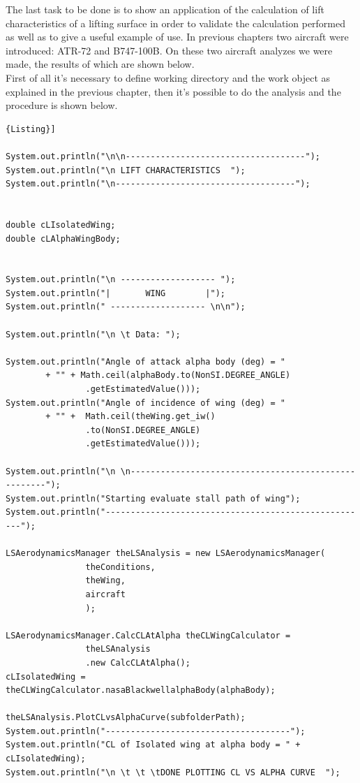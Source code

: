The last task to be done is to show an application of the calculation of lift characteristics of a lifting surface in order
to validate the calculation performed as well as to give a useful example of use. In previous chapters two aircraft were introduced:
ATR-72 and B747-100B. On these two aircraft analyzes we were made, the results of which are shown below.\\
First of all it's necessary to define working directory and the work object as explained in the previous chapter, then it's possible to do the analysis and the procedure is shown below.

\begin{lstlisting}[frame=rbl,caption={{\footnotesize Lift Characteristics of a Lifting Surface - Test Class}},label= [style=\bfseries]{Listing}]

System.out.println("\n\n------------------------------------");
System.out.println("\n LIFT CHARACTERISTICS  ");
System.out.println("\n------------------------------------");


double cLIsolatedWing;
double cLAlphaWingBody;


System.out.println("\n ------------------- ");
System.out.println("|       WING        |");
System.out.println(" ------------------- \n\n");

System.out.println("\n \t Data: ");

System.out.println("Angle of attack alpha body (deg) = "
		+ "" + Math.ceil(alphaBody.to(NonSI.DEGREE_ANGLE)
				.getEstimatedValue()));
System.out.println("Angle of incidence of wing (deg) = "
		+ "" +  Math.ceil(theWing.get_iw()
				.to(NonSI.DEGREE_ANGLE)
				.getEstimatedValue()));

System.out.println("\n \n-----------------------------------------------------");
System.out.println("Starting evaluate stall path of wing");
System.out.println("-----------------------------------------------------");

LSAerodynamicsManager theLSAnalysis = new LSAerodynamicsManager(
				theConditions,
				theWing,
				aircraft
				);
				
LSAerodynamicsManager.CalcCLAtAlpha theCLWingCalculator = 
				theLSAnalysis
				.new CalcCLAtAlpha();
cLIsolatedWing = theCLWingCalculator.nasaBlackwellalphaBody(alphaBody);

theLSAnalysis.PlotCLvsAlphaCurve(subfolderPath);
System.out.println("-------------------------------------");
System.out.println("CL of Isolated wing at alpha body = " + cLIsolatedWing);
System.out.println("\n \t \t \tDONE PLOTTING CL VS ALPHA CURVE  ");


\end{lstlisting}
